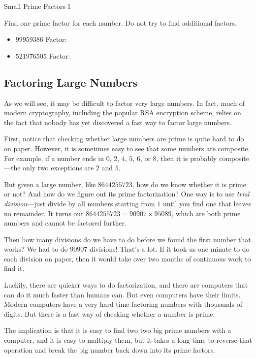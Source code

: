 \documentclass[a4paper,10pt]{report}
\begin{document}
\begin{problem}{Small Prime Factors I}

 Find one prime factor for each number. Do not try to find additional factors.

 \begin{itemize}
  \item \(99959386\) \hfill Factor: 
  \item \(521976505\) \hfill Factor: 
 \end{itemize}

\end{problem}

\subsection{Factoring Large Numbers}

As we will see, it may be difficult to factor very large numbers. In fact, much
of modern cryptography, including the popular RSA encryption scheme, relies on
the fact that nobody has yet discovered a fast way to factor large numbers.

First, notice that checking whether large numbers are prime is quite hard to do
on paper. However, it is sometimes easy to see that some numbers are composite.
For example, if a number ends in \(0\), \(2\), \(4\), \(5\), \(6\), or \(8\),
then it is probably composite---the only two exceptions are \(2\) and \(5\).

But given a large number, like \(8644255723\), how do we know whether it is
prime or not? And how do we figure out its prime factorization? One way is to
use \emph{trial division}---just divide by all numbers starting from \(1\)
until you find one that leaves no remainder. It turns out \(8644255723 =
90907\times95089\), which are both prime numbers and cannot be factored
further.

Then how many divisions do we have to do before we found the first number that
works? We had to do \(90907\) divisions! That's a lot. If it took us one minute
to do each division on paper, then it would take over two months of continuous
work to find it.

Luckily, there are quicker ways to do factorization, and there are computers
that can do it much faster than humans can. But even computers have their
limits. Modern computers have a very hard time factoring numbers with thousands
of digits. But there is a fast way of checking whether a number is prime.

The implication is that it is easy to find two two big prime numbers with a
computer, and it is easy to multiply them, but it takes a long time to reverse
that operation and break the big number back down into its prime factors.
\end{document}
